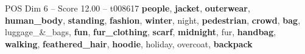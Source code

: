 \begin{textsample}{POS Dim 6 – Score 12.00 – t008617}  \label{ex:f6_pos_027}
\textbf{people}, \textbf{jacket}, \textbf{outerwear}, \textbf{human\_body}, \textbf{standing}, \textbf{fashion}, \textbf{winter}, night, \textbf{pedestrian}, \textbf{crowd}, \textbf{bag}, luggage\_\&\_bags, \textbf{fun}, \textbf{fur\_clothing}, \textbf{scarf}, \textbf{midnight}, fur, \textbf{handbag}, \textbf{walking}, \textbf{feathered\_hair}, \textbf{hoodie}, holiday, overcoat, \textbf{backpack}

\end{textsample}
